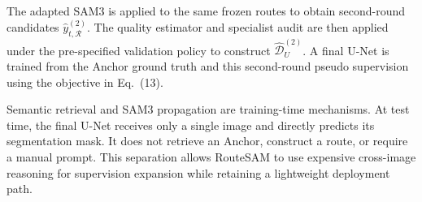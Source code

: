 \documentclass[a4paper,fleqn]{cas-dc}
\begin{document}
The adapted SAM3 is applied to the same frozen routes to obtain second-round candidates $\hat{y}_{t,\mathcal{R}}^{(2)}$. The quality estimator and specialist audit are then applied under the pre-specified validation policy to construct $\widehat{\mathcal{D}}_{U}^{(2)}$. A final U-Net is trained from the Anchor ground truth and this second-round pseudo supervision using the objective in Eq.~(13).

Semantic retrieval and SAM3 propagation are training-time mechanisms. At test time, the final U-Net receives only a single image and directly predicts its segmentation mask. It does not retrieve an Anchor, construct a route, or require a manual prompt. This separation allows RouteSAM to use expensive cross-image reasoning for supervision expansion while retaining a lightweight deployment path.

\printcredits

%





\end{document}
